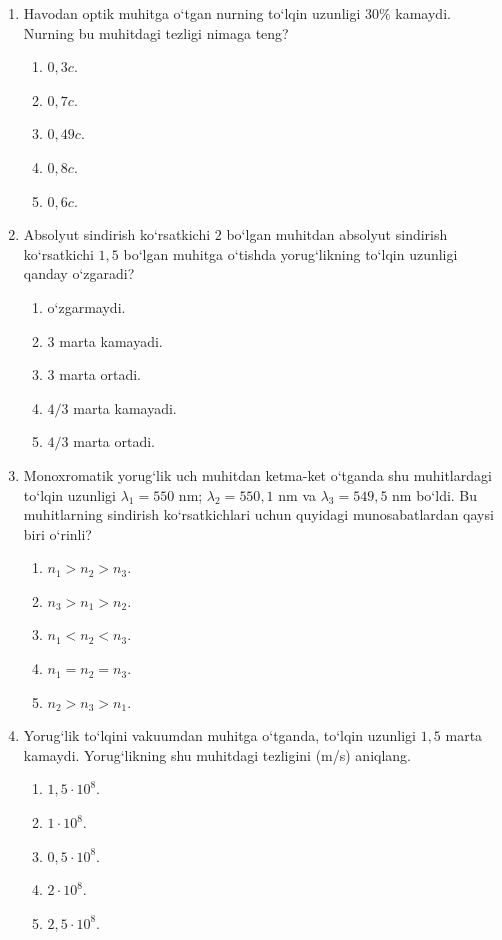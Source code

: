 \begin{enumerate}
\item Havodan optik muhitga o‘tgan nurning to‘lqin uzunligi $30\%$ kamaydi. Nurning bu muhitdagi tezligi nimaga teng?
\begin{enumerate}[label=\Alph*)]
\item $0,3c$.
\item $0,7c$.
\item $0,49c$.
\item $0,8c$.
\item $0,6c$.
\end{enumerate}

\item Absolyut sindirish ko‘rsatkichi $2$ bo‘lgan muhitdan absolyut sindirish ko‘rsatkichi $1,5$ bo‘lgan muhitga o‘tishda yorug‘likning to‘lqin uzunligi qanday o‘zgaradi?
\begin{enumerate}[label=\Alph*)]
\item o‘zgarmaydi.
\item $3$ marta kamayadi.
\item $3$ marta ortadi.
\item $4/3$ marta kamayadi.
\item $4/3$ marta ortadi.
\end{enumerate}

\item Monoxromatik yorug‘lik uch muhitdan ketma-ket o‘tganda shu muhitlardagi to‘lqin uzunligi $\lambda_1=550$ nm; $\lambda_2=550{,}1$ nm va $\lambda_3=549{,}5$ nm bo‘ldi. Bu muhitlarning sindirish ko‘rsatkichlari uchun quyidagi munosabatlardan qaysi biri o‘rinli?
\begin{enumerate}[label=\Alph*)]
\item $n_1>n_2>n_3$.
\item $n_3>n_1>n_2$.
\item $n_1<n_2<n_3$.
\item $n_1=n_2=n_3$.
\item $n_2>n_3>n_1$.
\end{enumerate}

\item Yorug‘lik to‘lqini vakuumdan muhitga o‘tganda, to‘lqin uzunligi $1,5$ marta kamaydi. Yorug‘likning shu muhitdagi tezligini (m/s) aniqlang.
\begin{enumerate}[label=\Alph*)]
\item $1,5\cdot10^8$.
\item $1\cdot10^8$.
\item $0,5\cdot10^8$.
\item $2\cdot10^8$.
\item $2,5\cdot10^8$.
\end{enumerate}


\end{enumerate}

